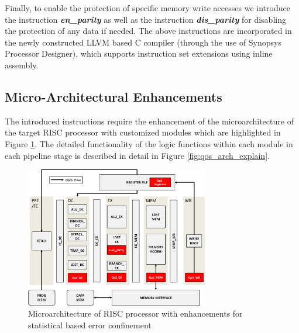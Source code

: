 Finally, to enable the protection of specific memory write accesses we introduce 
the instruction \textit{\textbf{en\_parity}} as well as the instruction  \textit{\textbf{dis\_parity}} 
for disabling the protection of any data if needed. The above instructions are incorporated in the newly constructed LLVM based C compiler (through the use of Synopsys Processor Designer), which supports instruction set extensions using inline assembly.



\subsection{Micro-Architectural Enhancements}

The introduced instructions require the enhancement of the microarchitecture of the target RISC processor with customized modules   
which are highlighted in Figure \ref{fig:qos_processor}. The detailed functionality of the logic functions within each module in each pipeline stage is described in detail in Figure \ref{fig:qos_arch_explain}.

\begin{figure}
\centering
\includegraphics[width=80mm]{./eps/qos_processor}
\caption{Microarchitecture of RISC processor with enhancements for statistical based error confinement}
\vspace{-3mm}
\label{fig:qos_processor}
\end{figure}

